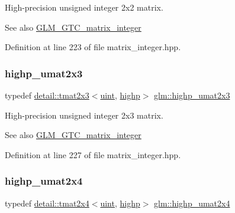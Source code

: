 High-\/precision unsigned integer 2x2 matrix. \begin{DoxySeeAlso}{See also}
\hyperlink{group__gtc__matrix__integer}{G\+L\+M\+\_\+\+G\+T\+C\+\_\+matrix\+\_\+integer} 
\end{DoxySeeAlso}


Definition at line 223 of file matrix\+\_\+integer.\+hpp.

\mbox{\label{group__gtc__matrix__integer_ga309076d055b5511a7071ebb5f660ed83}} 
\subsubsection{\texorpdfstring{highp\+\_\+umat2x3}{highp\_umat2x3}}
{\footnotesize\ttfamily typedef \hyperlink{structglm_1_1detail_1_1tmat2x3}{detail\+::tmat2x3}$<$\hyperlink{group__core__precision_ga4fd29415871152bfb5abd588334147c8}{uint}, \hyperlink{namespaceglm_a0f04f086094c747d227af4425893f545ac6f7eab42eacbb10d59a58e95e362074}{highp}$>$ \hyperlink{group__gtc__matrix__integer_ga309076d055b5511a7071ebb5f660ed83}{glm\+::highp\+\_\+umat2x3}}

High-\/precision unsigned integer 2x3 matrix. \begin{DoxySeeAlso}{See also}
\hyperlink{group__gtc__matrix__integer}{G\+L\+M\+\_\+\+G\+T\+C\+\_\+matrix\+\_\+integer} 
\end{DoxySeeAlso}


Definition at line 227 of file matrix\+\_\+integer.\+hpp.

\mbox{\label{group__gtc__matrix__integer_gabe8572c228aecc0bfa7ba92415b1c651}} 
\subsubsection{\texorpdfstring{highp\+\_\+umat2x4}{highp\_umat2x4}}
{\footnotesize\ttfamily typedef \hyperlink{structglm_1_1detail_1_1tmat2x4}{detail\+::tmat2x4}$<$\hyperlink{group__core__precision_ga4fd29415871152bfb5abd588334147c8}{uint}, \hyperlink{namespaceglm_a0f04f086094c747d227af4425893f545ac6f7eab42eacbb10d59a58e95e362074}{highp}$>$ \hyperlink{group__gtc__matrix__integer_gabe8572c228aecc0bfa7ba92415b1c651}{glm\+::highp\+\_\+umat2x4}}

